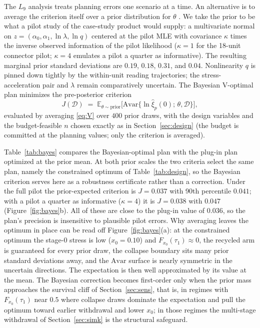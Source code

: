 \documentclass[11pt]{article}
\newcommand{\Asvar}{\mathrm{Avar}}
\newcommand{\E}{\mathbb{E}}
\begin{document}
The $L_9$ analysis treats planning errors one scenario at a time. An alternative is to
average the criterion itself over a prior distribution for $\theta$ \citep[cf.][]{Li2017}. We
take the prior to be what a pilot study of the case-study product would supply: a multivariate
normal on $z=(\alpha_0,\alpha_1,\ln\lambda,\ln q)$ centered at the pilot MLE with covariance
$\kappa$ times the inverse observed information of the pilot likelihood ($\kappa=1$ for the
18-unit connector pilot; $\kappa=4$ emulates a pilot a quarter as informative). The resulting
marginal prior standard deviations are $0.19$, $0.18$, $0.31$, and $0.04$. Nonlinearity $q$ is
pinned down tightly by the within-unit reading trajectories; the stress-acceleration pair and
$\lambda$ remain comparatively uncertain. The Bayesian
V-optimal plan minimizes the pre-posterior criterion
\begin{equation}\label{eq:bayes}
J(\mathcal{D})\;=\;\E_{\theta\sim\text{prior}}\big[\Asvar\{\ln\hat\xi_p(0);\,\theta,\mathcal{D}\}\big],
\end{equation}
evaluated by averaging \eqref{eq:V} over $400$ prior draws, with the design variables and the
budget-feasible $n$ chosen exactly as in Section~\ref{sec:design} (the budget is committed at
the planning values; only the criterion is averaged).

Table~\ref{tab:bayes} compares the Bayesian-optimal plan with the plug-in plan optimized at
the prior mean. At both prior scales the two criteria select the same plan, namely the
constrained optimum of Table~\ref{tab:design}, so the Bayesian criterion serves here as a
robustness certificate rather than a correction. Under the full pilot the prior-expected
criterion is $J=0.037$ with 90th percentile $0.041$; with a pilot a quarter as informative
($\kappa=4$) it is $J=0.038$ with $0.047$ (Figure~\ref{fig:bayes}b). All of these are close
to the plug-in value of $0.036$, so the plan's precision is insensitive to plausible pilot
errors. Why averaging leaves the optimum in place can be read off Figure~\ref{fig:bayes}(a):
at the constrained optimum the stage-$0$ stress is low ($x_0=0.10$) and
$F_{x_0}(\tau_1)\approx0$, the recycled arm is guaranteed for every prior draw, the collapse
boundary sits many prior standard deviations away, and the $\Asvar$ surface is nearly
symmetric in the uncertain directions. The expectation is then well approximated by its value
at the mean. The Bayesian correction becomes first-order only when the prior mass approaches
the survival cliff of Section~\ref{sec:sens}, that is, in regimes with $F_{x_0}(\tau_1)$ near
$0.5$ where collapse draws dominate the expectation and pull the optimum toward earlier
withdrawal and lower $x_0$; in those regimes the multi-stage withdrawal of
Section~\ref{sec:simk} is the structural safeguard.
\end{document}

